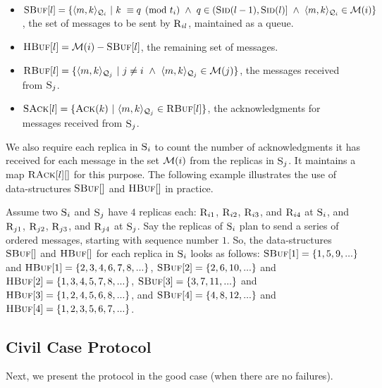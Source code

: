 \begin{itemize}[wide]
\item $\textsc{SBuf}[{l}] = \{\langle m, k\rangle_{\mathcal{Q}_{i}} ~|~ k ~\equiv q \pmod{t_i} ~\wedge ~q \in (\textsc{Sid}({l-1}), \textsc{Sid}({l})] ~\wedge  ~\langle m, k\rangle_{\mathcal{Q}_{i}} \in \mathcal{M}(i) \}$, the set of messages to be sent by $\textsc{R}_{{i}{l}}$, maintained as a queue.

\item $\textsc{HBuf}[{l}] = \mathcal{M}(i) - \textsc{SBuf}[{l}]$, the remaining set of messages.

\item $\textsc{RBuf}[{l}] = \{\langle m, k\rangle_{\mathcal{Q}_{j}} ~|~ j \neq i ~\wedge ~\langle m, k\rangle_{\mathcal{Q}_{j}} \in \mathcal{M}(j) \}$, the messages received from \RSM{} $\textsc{S}_{j}$.

\item $\textsc{SAck}[{l}] = \{\textsc{Ack}(k) ~|~ \langle m, k\rangle_{\mathcal{Q}_{j}} \in \textsc{RBuf}[{l}] \}$, the acknowledgments for messages received from \RSM{} $\textsc{S}_{j}$.

\end{itemize}
%
We also require each replica in \RSM{} $\textsc{S}_{i}$ to count the number of acknowledgments it has received for 
each message in the set $\mathcal{M}(i)$ from the replicas in \RSM{} $\textsc{S}_{j}$. 
It maintains a map $\textsc{RAck}[{l}][{}]$ for this purpose. 
The following example illustrates the use of data-structures $\textsc{SBuf}[{}]$ and $\textsc{HBuf}[{}]$ in practice.


\begin{example}\label{ex:rep-send}
Assume two  $\textsc{S}_{i}$ and $\textsc{S}_{j}$ have $4$ replicas each: 
$\textsc{R}_{{i}{1}}$, $\textsc{R}_{{i}{2}}$, $\textsc{R}_{{i}{3}}$, and $\textsc{R}_{{i}{4}}$ at $\textsc{S}_{i}$, and 
$\textsc{R}_{{j}{1}}$, $\textsc{R}_{{j}{2}}$, $\textsc{R}_{{j}{3}}$, and $\textsc{R}_{{j}{4}}$ at $\textsc{S}_{j}$.
Say the replicas of \RSM{} $\textsc{S}_{i}$ plan to send a series of ordered messages, starting with sequence number $1$. 
So, the data-structures $\textsc{SBuf}[{}]$ and $\textsc{HBuf}[{}]$ for each replica in $\textsc{S}_{i}$ looks as follows:
$\textsc{SBuf}[{1}] = \{1,5,9,...\}$ and $\textsc{HBuf}[{1}] = \{2,3,4,6,7,8,...\}$, 
$\textsc{SBuf}[{2}] = \{2,6,10,...\}$ and $\textsc{HBuf}[{2}] = \{1,3,4,5,7,8,...\}$, 
$\textsc{SBuf}[{3}] = \{3,7,11,...\}$ and $\textsc{HBuf}[{3}] = \{1,2,4,5,6,8,...\}$, and
$\textsc{SBuf}[{4}] = \{4,8,12,...\}$ and $\textsc{HBuf}[{4}] = \{1,2,3,5,6,7,...\}$.
\end{example}



\subsection{Civil Case Protocol}
Next, we present the \Scrooge{} protocol in the good case (when there are no failures).



